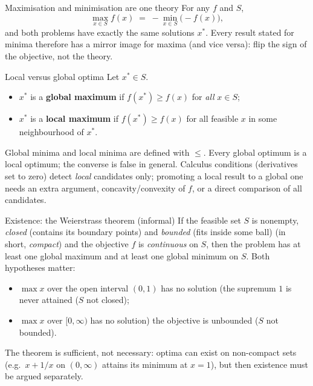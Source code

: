 \begin{rulebox}{Maximisation and minimisation are one theory}
For any $f$ and $S$,
\[
  \max_{x \in S} f(x) \;=\; -\min_{x \in S}\bigl(-f(x)\bigr),
\]
and both problems have exactly the same solutions $x^{*}$. Every result
stated for minima therefore has a mirror image for maxima (and vice
versa): flip the sign of the objective, not the theory.
\end{rulebox}

\begin{rulebox}{Local versus global optima}
Let $x^{*} \in S$.
\begin{itemize}[leftmargin=1.6em,itemsep=0.3ex]
  \item $x^{*}$ is a \textbf{global maximum} if
        $f(x^{*}) \ge f(x)$ for \emph{all} $x \in S$;
  \item $x^{*}$ is a \textbf{local maximum} if
        $f(x^{*}) \ge f(x)$ for all feasible $x$ in some neighbourhood of
        $x^{*}$.
\end{itemize}
Global minima and local minima are defined with $\le$. Every global
optimum is a local optimum; the converse is false in general. Calculus
conditions (derivatives set to zero) detect \emph{local} candidates only;
promoting a local result to a global one needs an extra argument,
concavity/convexity of $f$, or a direct comparison of all candidates.
\end{rulebox}

\begin{rulebox}{Existence: the Weierstrass theorem (informal)}
If the feasible set $S$ is nonempty, \emph{closed} (contains its boundary
points) and \emph{bounded} (fits inside some ball) (in short,
\emph{compact}) and the objective $f$ is
\emph{continuous} on $S$, then the problem has at least one global
maximum and at least one global minimum on $S$. Both hypotheses matter:
\begin{itemize}[leftmargin=1.6em,itemsep=0.3ex]
  \item $\max x$ over the open interval $(0,1)$ has no solution (the
        supremum $1$ is never attained ($S$ not closed);
  \item $\max x$ over $[0,\infty)$ has no solution) the objective is
        unbounded ($S$ not bounded).
\end{itemize}
The theorem is sufficient, not necessary: optima can exist on non-compact
sets (e.g.\ $x + 1/x$ on $(0,\infty)$ attains its minimum at $x=1$), but
then existence must be argued separately.
\end{rulebox}

